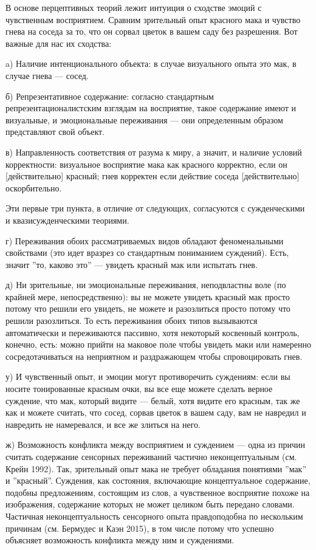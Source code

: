 \documentclass[11pt]{book}
\begin{document}
В основе перцептивных теорий лежит интуиция о сходстве эмоций с чувственным восприятием. Сравним зрительный опыт красного мака и чувство гнева на соседа за то, что он сорвал цветок в вашем саду без разрешения. Вот важные для нас их сходства:

\smallskip

a) Наличие интенционального объекта: в случае визуального опыта это мак, в случае гнева --- сосед.

б) Репрезентативное содержание: согласно стандартным репрезентационалистским взглядам на восприятие, такое содержание имеют и визуальные, и эмоциональные переживания --- они определенным образом представляют свой объект.

в) Направленность соответствия от разума к миру, а значит, и наличие условий корректности: визуальное восприятие мака как красного корректно, если он [действительно] красный; гнев корректен если действие соседа [действительно] оскорбительно.

\smallskip

Эти первые три пункта, в отличие от следующих, согласуются с сужденческими и квазисужденческими теориями.

г) Переживания обоих рассматриваемых видов обладают феноменальными свойствами (это идет вразрез со стандартным пониманием суждений). Есть, значит ''то, каково это'' --- увидеть красный мак или испытать гнев.

д) Ни зрительные, ни эмоциональные переживания, неподвластны воле (по крайней мере, непосредственно): вы не можете увидеть красный мак просто потому что решили его увидеть, не можете и разозлиться просто потому что решили разозлиться. То есть переживания обоих типов вызываются автоматически и переживаются пассивно, хотя некоторый косвенный контроль, конечно, есть: можно прийти на маковое поле чтобы увидеть маки или намеренно сосредотачиваться на неприятном и раздражающем чтобы спровоцировать гнев.

у) И чувственный опыт, и эмоции могут противоречить суждениям: если вы носите тонированные красным очки, вы все еще можете сделать верное суждение, что мак, который видите --- белый, хотя видите его красным, так же как и можете считать, что сосед, сорвав цветок в вашем саду, вам не навредил и навредить не намеревался, и все же злиться на него.

ж) Возможность конфликта между восприятием и суждением --- одна из причин считать содержание сенсорных переживаний частично неконцептуальным (см. Крейн 1992). Так, зрительный опыт мака не требует обладания понятиями ''мак'' и ''красный''. Суждения, как состояния, включающие концептуальное содержание, подобны предложениям, состоящим из слов, а чувственное восприятие похоже на изображения, содержание которых не может целиком быть передано словами. Частичная неконцептуальность сенсорного опыта правдоподобна по нескольким причинам (см. Бермудес и Каэн 2015), в том числе потому что успешно объясняет возможность конфликта между ним и суждениями.
\end{document}
